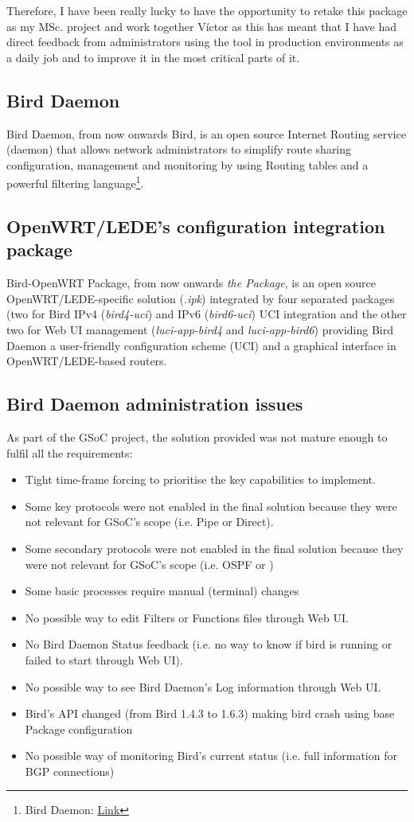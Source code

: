 Therefore, I have been really lucky to have the opportunity to retake this package as my MSc. project and work together Víctor as this has meant that I have had direct feedback from administrators using the tool in production environments as a daily job and to improve it in the most critical parts of it.

\subsection{Bird Daemon}
Bird Daemon, from now onwards Bird, is an open source Internet Routing service (daemon) that allows network administrators to simplify route sharing configuration, management and monitoring by using Routing tables and a powerful filtering language\footnote{Bird Daemon: \href{http://bird.network.cz/}{Link}}.

\subsection{OpenWRT/LEDE's configuration integration package}
Bird-OpenWRT Package, from now onwards \textit{the Package}, is an open source OpenWRT/LEDE-specific solution (\textit{.ipk}) integrated by four separated packages (two for Bird IPv4 (\textit{bird4-uci}) and IPv6 (\textit{bird6-uci}) UCI integration and the other two for Web UI management (\textit{luci-app-bird4} and \textit{luci-app-bird6}) providing Bird Daemon a user-friendly configuration scheme (UCI) and a graphical interface in OpenWRT/LEDE-based routers.

\subsection{Bird Daemon administration issues}
\label{subsec:bdai}
As part of the GSoC project, the solution provided was not mature enough to fulfil all the requirements:
\begin{itemize}
    \item Tight time-frame forcing to prioritise the key capabilities to implement.
    \item Some key protocols were not enabled in the final solution because they were not relevant for GSoC's scope (i.e. Pipe or Direct).
    \item Some secondary protocols were not enabled in the final solution because they were not relevant for GSoC's scope (i.e. OSPF or )
    \item Some basic processes require manual (terminal) changes
    \item No possible way to edit Filters or Functions files through Web UI.
    \item No Bird Daemon Status feedback (i.e. no way to know if bird is running or failed to start through Web UI).
    \item No possible way to see Bird Daemon's Log information through Web UI.
    \item Bird's API changed (from Bird 1.4.3 to 1.6.3) making bird crash using base Package configuration
    \item No possible way of monitoring Bird's current status (i.e. full information for BGP connections)
\end{itemize}
